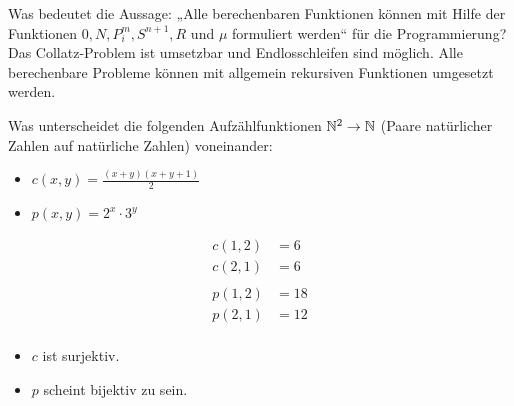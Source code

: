 \begin{card}
  Was bedeutet die Aussage: „Alle berechenbaren Funktionen können mit Hilfe der Funktionen $0, N, P^m_i, S^{n+1}, R$ und $\mu$ formuliert werden“ für die Programmierung?
  \hr
  Das Collatz-Problem ist umsetzbar und Endlosschleifen sind möglich. Alle berechenbare Probleme können mit allgemein rekursiven Funktionen umgesetzt werden.
\end{card}

\begin{card}
  Was unterscheidet die folgenden Aufzählfunktionen $\mathbb{N}^2 \rightarrow \mathbb{N}$ (Paare natürlicher Zahlen auf natürliche Zahlen) voneinander:
  \begin{itemize}
    \item $c(x, y) = \frac{(x + y)(x + y + 1)}{2}$
    \item $p(x, y) = 2^x \cdot 3^y$
  \end{itemize}
  \hr
  \begin{align*}
    c(1,2) &= 6 \\
    c(2,1) &= 6 \\
    \\
    p(1,2) &= 18 \\
    p(2,1) &= 12 \\
  \end{align*}

  \begin{itemize}
    \item $c$ ist surjektiv.
    \item $p$ scheint bijektiv zu sein.
  \end{itemize}
\end{card}
